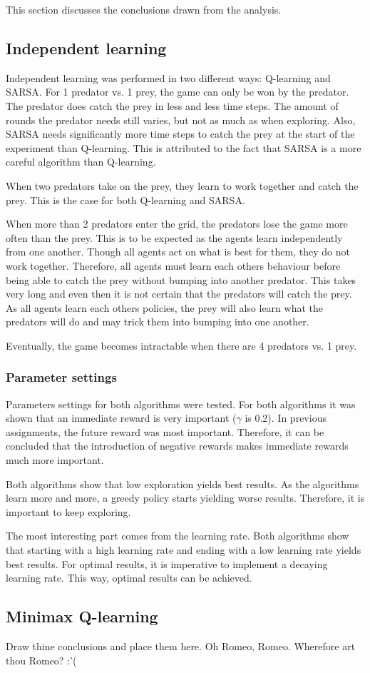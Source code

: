 This section discusses the conclusions drawn from the analysis. %

\subsection{Independent learning}
Independent learning was performed in two different ways: Q-learning and SARSA. For 1 predator vs. 1 prey, the game can only be won by the predator. The predator does catch the prey in less and less time steps. The amount of rounds the predator needs still varies, but not as much as when exploring. Also, SARSA needs significantly more time steps to catch the prey at the start of the experiment than Q-learning. This is attributed to the fact that SARSA is a more careful algorithm than Q-learning.

When two predators take on the prey, they learn to work together and catch the prey. This is the case for both Q-learning and SARSA.

When more than 2 predators enter the grid, the predators lose the game more often than the prey. This is to be expected as the agents learn independently from one another. Though all agents act on what is best for them, they do not work together. Therefore, all agents must learn each others behaviour before being able to catch the prey without bumping into another predator. This takes very long and even then it is not certain that the predators will catch the prey. As all agents learn each others policies, the prey will also learn what the predators will do and may trick them into bumping into one another. 

Eventually, the game becomes intractable when there are 4 predators vs. 1 prey.

\subsubsection{Parameter settings}
Parameters settings for both algorithms were tested. For both algorithms it was shown that an immediate reward is very important ($\gamma$ is 0.2). In previous assignments, the future reward was most important. Therefore, it can be concluded that the introduction of negative rewards makes immediate rewards much more important.

Both algorithms show that low exploration yields best results. As the algorithms learn more and more, a greedy policy starts yielding worse results. Therefore, it is important to keep exploring.

The most interesting part comes from the learning rate. Both algorithms show that starting with a high learning rate and ending with a low learning rate yields best results. For optimal results, it is imperative to implement a decaying learning rate. This way, optimal results can be achieved.

\subsection{Minimax Q-learning}
Draw thine conclusions and place them here. Oh Romeo, Romeo. Wherefore art thou Romeo? :'(